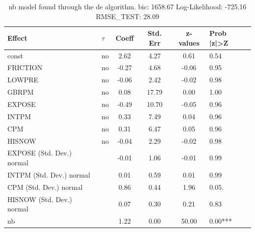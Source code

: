 \begin{table}
	\caption{nb model found through the de algorithm. bic: 1658.67 Log-Likelihood: -725.16 RMSE_TEST: 28.09}
	\begin{center}
		\begin{tabular}{|l|l|c|c|c|l|}
			\hline
			Effect & $\tau$ & Coeff & Std. Err & z-values & Prob |z|>Z \\
			\hline
			const & no & 2.62 & 4.27 & 0.61 & 0.54 \\
			\hline
			FRICTION & no & -0.27 & 4.68 & -0.06 & 0.95 \\
			\hline
			LOWPRE & no & -0.06 & 2.42 & -0.02 & 0.98 \\
			\hline
			GBRPM & no & 0.08 & 17.79 & 0.00 & 1.00 \\
			\hline
			EXPOSE & no & -0.49 & 10.70 & -0.05 & 0.96 \\
			\hline
			INTPM & no & 0.33 & 7.49 & 0.04 & 0.96 \\
			\hline
			CPM & no & 0.31 & 6.47 & 0.05 & 0.96 \\
			\hline
			HISNOW & no & -0.04 & 2.29 & -0.02 & 0.98 \\
			\hline
			EXPOSE (Std. Dev.) normal &  & -0.01 & 1.06 & -0.01 & 0.99 \\
			\hline
			INTPM (Std. Dev.) normal &  & 0.01 & 0.59 & 0.01 & 0.99 \\
			\hline
			CPM (Std. Dev.) normal &  & 0.86 & 0.44 & 1.96 & 0.05. \\
			\hline
			HISNOW (Std. Dev.) normal &  & 0.07 & 0.30 & 0.21 & 0.83 \\
			\hline
			nb &  & 1.22 & 0.00 & 50.00 & 0.00*** \\
			\hline
		\end{tabular}
	\end{center}
\end{table}